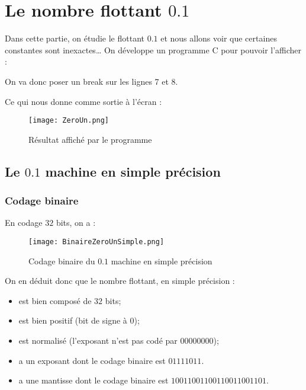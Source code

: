 \documentclass[a4paper, titlepage]{livret} %
\begin{document}
	\chapter{Le nombre flottant $0.1$}
		Dans cette partie, on étudie le flottant $0.1$ et nous allons voir que certaines constantes sont inexactes…
		On développe un programme C pour pouvoir l'afficher :
		
		On va donc poser un break sur les lignes 7 et 8.

		Ce qui nous donne comme sortie à l'écran :
		\begin{figure}[!h]
			\centering
  				\texttt{[image: ZeroUn.png]}
  				\caption{Résultat affiché par le programme}
		\end{figure}

		\section{Le $0.1$ machine en simple précision}
			\subsection{Codage binaire}
				En codage $32$ bits, on a :
				\begin{figure}[!h]
					\centering
  						\texttt{[image: BinaireZeroUnSimple.png]}
  						\caption{Codage binaire du $0.1$ machine en simple précision}
				\end{figure}

				On en déduit donc que le nombre flottant, en simple précision :
				\begin{itemize}
					\item est bien composé de $32$ bits;
					\item est bien positif (bit de signe à 0);
					\item est normalisé (l'exposant n'est pas codé par $00000000$);
					\item a un exposant dont le codage binaire est $01111011$.
					\item a une mantisse dont le codage binaire est $10011001 10011001 1001101$.
				\end{itemize}
\end{document}
